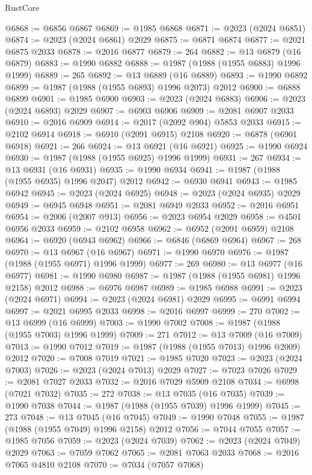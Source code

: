 \begin{lexlean}{RustCore}
\begin{coremodule}
@6868 := @6856 @6867
@6869 := @1985 @6868
@6871 := @2023 (@2024 @6851)
@6874 := @2023 (@2024 @6861) @2029
@6875 := @6871 @6874
@6877 := @2021 @6875 @2033
@6878 := @2016 @6877
@6879 := 264
@6882 := @13 @6879 (@16 @6879)
@6883 := @1990 @6882
@6888 := @1987 (@1988 (@1955 @6883) @1996 @1999)
@6889 := 265
@6892 := @13 @6889 (@16 @6889)
@6893 := @1990 @6892
@6899 := @1987 (@1988 (@1955 @6893) @1996 @2073) @2012
@6900 := @6888 @6899
@6901 := @1985 @6900
@6903 := @2023 (@2024 @6883)
@6906 := @2023 (@2024 @6893) @2029
@6907 := @6903 @6906
@6909 := @2081 @6907 @2033
@6910 := @2016 @6909
@6914 := @2017 (@2092 @904) @5853 @2033
@6915 := @2102 @6914
@6918 := @6910 (@2091 @6915) @2108
@6920 := @6878 (@6901 @6918)
@6921 := 266
@6924 := @13 @6921 (@16 @6921)
@6925 := @1990 @6924
@6930 := @1987 (@1988 (@1955 @6925) @1996 @1999)
@6931 := 267
@6934 := @13 @6931 (@16 @6931)
@6935 := @1990 @6934
@6941 := @1987 (@1988 (@1955 @6935) @1996 @2047) @2012
@6942 := @6930 @6941
@6943 := @1985 @6942
@6945 := @2023 (@2024 @6925)
@6948 := @2023 (@2024 @6935) @2029
@6949 := @6945 @6948
@6951 := @2081 @6949 @2033
@6952 := @2016 @6951
@6954 := @2006 (@2007 @913)
@6956 := @2023 @6954 @2029
@6958 := @4501 @6956 @2033
@6959 := @2102 @6958
@6962 := @6952 (@2091 @6959) @2108
@6964 := @6920 (@6943 @6962)
@6966 := @6846 (@6869 @6964)
@6967 := 268
@6970 := @13 @6967 (@16 @6967)
@6971 := @1990 @6970
@6976 := @1987 (@1988 (@1955 @6971) @1996 @1999)
@6977 := 269
@6980 := @13 @6977 (@16 @6977)
@6981 := @1990 @6980
@6987 := @1987 (@1988 (@1955 @6981) @1996 @2158) @2012
@6988 := @6976 @6987
@6989 := @1985 @6988
@6991 := @2023 (@2024 @6971)
@6994 := @2023 (@2024 @6981) @2029
@6995 := @6991 @6994
@6997 := @2021 @6995 @2033
@6998 := @2016 @6997
@6999 := 270
@7002 := @13 @6999 (@16 @6999)
@7003 := @1990 @7002
@7008 := @1987 (@1988 (@1955 @7003) @1996 @1999)
@7009 := 271
@7012 := @13 @7009 (@16 @7009)
@7013 := @1990 @7012
@7019 := @1987 (@1988 (@1955 @7013) @1996 @2009) @2012
@7020 := @7008 @7019
@7021 := @1985 @7020
@7023 := @2023 (@2024 @7003)
@7026 := @2023 (@2024 @7013) @2029
@7027 := @7023 @7026
@7029 := @2081 @7027 @2033
@7032 := @2016 @7029 @5909 @2108
@7034 := @6998 (@7021 @7032)
@7035 := 272
@7038 := @13 @7035 (@16 @7035)
@7039 := @1990 @7038
@7044 := @1987 (@1988 (@1955 @7039) @1996 @1999)
@7045 := 273
@7048 := @13 @7045 (@16 @7045)
@7049 := @1990 @7048
@7055 := @1987 (@1988 (@1955 @7049) @1996 @2158) @2012
@7056 := @7044 @7055
@7057 := @1985 @7056
@7059 := @2023 (@2024 @7039)
@7062 := @2023 (@2024 @7049) @2029
@7063 := @7059 @7062
@7065 := @2081 @7063 @2033
@7068 := @2016 @7065 @4810 @2108
@7070 := @7034 (@7057 @7068)

\end{coremodule}
\end{lexlean}

